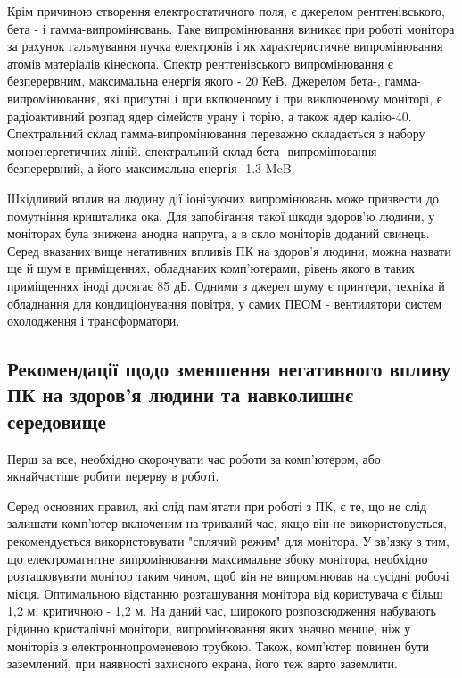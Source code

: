 Крім причиною створення електростатичного поля, є джерелом рентгенівського, бета - і гамма-випромінювань. Таке випромінювання виникає при роботі монітора за рахунок гальмування пучка електронів і як характеристичне випромінювання атомів матеріалів кінескопа. Спектр рентгенівського випромінювання є безперервним, максимальна енергія якого - 20 КеВ. Джерелом бета-, гамма-випромінювання, які присутні і при включеному і при виключеному моніторі, є радіоактивний розпад ядер сімейств урану і торію, а також ядер калію-40. Спектральний склад гамма-випромінювання переважно складається з набору моноенергетичних ліній. спектральний склад бета- випромінювання безперервний, а його максимальна енергія -1.3 MeB. 

Шкідливий вплив на людину дії іонізуючих випромінювань може призвести до помутніння кришталика ока. Для запобігання такої шкоди здоров’ю людини, у моніторах була знижена анодна напруга, а в скло моніторів доданий свинець.
Серед вказаних вище негативних впливів ПК на здоров’я людини, можна назвати ще й шум в приміщеннях, обладнаних комп'ютерами, рівень якого в таких приміщеннях іноді досягає 85 дБ. Одними з джерел шуму є принтери, техніка й обладнання для кондиціонування повітря, у самих ПЕОМ - вентилятори систем охолодження і трансформатори. 


\subsection{Рекомендації щодо зменшення негативного впливу ПК на здоров'я
 людини та навколишнє середовище}

Перш за все, необхідно    скорочувати   час    роботи   за   комп'ютером, або якнайчастіше робити перерву в роботі. 

Серед основних правил, які слід пам’ятати при роботі з ПК, є те, що не слід залишати комп'ютер включеним на тривалий час, якщо він не використовується, рекомендується використовувати "сплячий режим"     для     монітора.     У    зв'язку     з    тим,     що     електромагнітне випромінювання максимальне збоку монітора,   необхідно розташовувати монітор таким чином, щоб він не випромінював на сусідні робочі місця. Оптимальною відстанню розташування монітора від користувача є більш 1,2 м, критичною - 1,2 м. На даний час, широкого розповсюдження набувають рідинно кристалічні монітори, випромінювання яких значно	менше,	ніж у моніторів з    електроннопроменевою трубкою. Також, комп'ютер повинен бути заземлений, при наявності захисного екрана, його теж варто заземлити.

